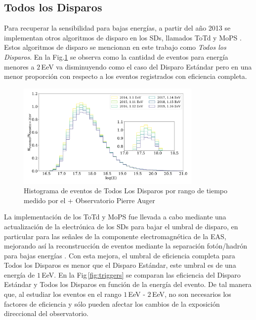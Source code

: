  
\subsection{Todos los Disparos}

Para recuperar la sensibilidad para bajas energías, a partir del año 2013  se implementan otros algoritmos de disparo en los SDs, llamados ToTd y MoPS \cite{pierre2013plans}. Estos algoritmos de disparo se mencionan en este trabajo como \textit{Todos los Disparos}.  En la Fig.\ref{fig:TLD} se observa como la cantidad de eventos para energía menores a $2\,$EeV va disminuyendo como el caso del Disparo Estándar pero en una menor proporción con respecto a los eventos registrados con eficiencia completa.

\begin{figure}[H]
	\centering
	\includegraphics[width=0.8\textwidth]{histograma_AllTriggers.pdf}
  \caption{Histograma de eventos de  Todos Los Disparos por rango de tiempo medido por el +
  Observatorio Pierre Auger}
	\label{fig:TLD}
\end{figure}

La implementación de los ToTd y MoPS fue llevada a cabo mediante una actualización de la electrónica de los SDs para bajar el umbral de disparo, en particular para las señales de la componente electromagnética de la EAS, mejorando así la reconstrucción de eventos mediante la separación fotón/hadrón para bajas energías  \cite{pierre2013plans}. Con esta mejora, el umbral de eficiencia completa para Todos los Disparos es menor que el Disparo Estándar, este umbral es de una energía de $1\,$EeV. En la Fig\,\ref{fig:triggers} se comparan las eficiencia del Disparo Estándar y Todos los Disparos en función de la energía del evento. De tal manera que, al estudiar los eventos en el rango $1\,$EeV - $2\,$EeV,  no son necesarios los factores de eficiencia y sólo pueden afectar los cambios de la exposición direccional del observatorio.


